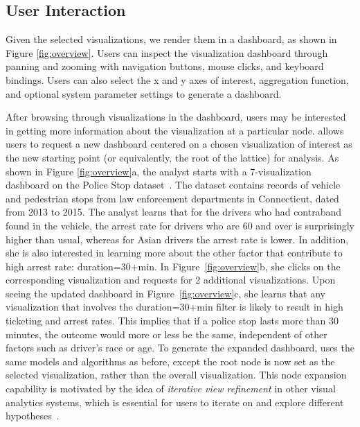 \subsection{User Interaction\label{sec:interaction}}
\par Given the selected visualizations, we render them in a dashboard, as shown in Figure \ref{fig:overview}. Users can inspect the visualization dashboard through panning and zooming with navigation buttons, mouse clicks, and keyboard bindings. Users can also select the x and y axes of interest, aggregation function, and optional system parameter settings to generate a dashboard.  
\par After browsing through visualizations in the dashboard, users may be interested in getting more information about the visualization at a particular node. \system allows users to request a new dashboard centered on a chosen visualization of interest as the new starting point (or equivalently, the root of the lattice) for analysis. As shown in Figure \ref{fig:overview}a, the analyst starts with a 7-visualization dashboard on the Police Stop dataset~\cite{police}. The dataset contains records of vehicle and pedestrian stops from law enforcement departments in Connecticut, dated from 2013 to 2015. The analyst learns that for the drivers who had contraband found in the vehicle, the arrest rate for drivers who are 60 and over is surprisingly higher than usual, whereas for Asian drivers the arrest rate is lower. In addition, she is also interested in learning more about the other factor that contribute to high arrest rate: duration=30+min. In Figure~\ref{fig:overview}b, she clicks on the corresponding visualization and requests for 2 additional visualizations. Upon seeing the updated dashboard in Figure~\ref{fig:overview}c, she learns that any visualization that involves the duration=30+min filter is likely to result in high ticketing and arrest rates. This implies that if a police stop lasts more than 30 minutes, the outcome would more or less be the same, independent of other factors such as driver's race or age. To generate the expanded dashboard, \system uses the same models and algorithms as before, except the root node is now set as the selected visualization, rather than the overall visualization. This node expansion capability is motivated by the idea of \textit{iterative view refinement} in other visual analytics systems, which is essential for users to iterate on and explore different hypotheses~\cite{Wongsuphasawat2016,Hoque2017}.
